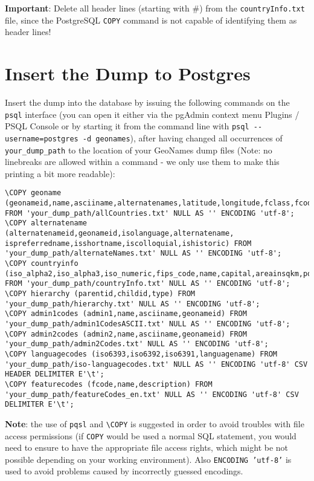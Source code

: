 \documentclass[fontsize=12pt, BCOR=10mm, DIV=14, parskip=true,headings=small]{scrartcl}
\begin{document}
\textbf{Important}: Delete all header lines (starting with \#) from the \texttt{countryInfo.txt} file, since the PostgreSQL \texttt{COPY} command is not capable of identifying them as header lines!

\section{Insert the Dump to Postgres}
Insert the dump into the database by issuing the following commands on the \texttt{psql} interface (you can open it either via the pgAdmin context menu Plugins / PSQL Console or by starting it from the command line with \verb|psql --username=postgres -d geonames|), after having changed all occurrences of \verb|your_dump_path| to the location of your GeoNames dump files (Note: no linebreaks are allowed within a command - we only use them to make this printing a bit more readable):
\begin{lstlisting}[breaklines]
\COPY geoname (geonameid,name,asciiname,alternatenames,latitude,longitude,fclass,fcode,country,cc2,admin1,admin2,admin3,admin4,population,elevation,gtopo30,timezone,moddate) FROM 'your_dump_path/allCountries.txt' NULL AS '' ENCODING 'utf-8';
\COPY alternatename (alternatenameid,geonameid,isolanguage,alternatename, ispreferredname,isshortname,iscolloquial,ishistoric) FROM 'your_dump_path/alternateNames.txt' NULL AS '' ENCODING 'utf-8';
\COPY countryinfo (iso_alpha2,iso_alpha3,iso_numeric,fips_code,name,capital,areainsqkm,population,continent,tld,currencycode,currencyname,phone,postalcodeformat,postalcoderegex,languages,geonameid,neighbors,equivfipscode) FROM 'your_dump_path/countryInfo.txt' NULL AS '' ENCODING 'utf-8';
\COPY hierarchy (parentid,childid,type) FROM 'your_dump_path/hierarchy.txt' NULL AS '' ENCODING 'utf-8';
\COPY admin1codes (admin1,name,asciiname,geonameid) FROM 'your_dump_path/admin1CodesASCII.txt' NULL AS '' ENCODING 'utf-8';
\COPY admin2codes (admin2,name,asciiname,geonameid) FROM 'your_dump_path/admin2Codes.txt' NULL AS '' ENCODING 'utf-8';
\COPY languagecodes (iso6393,iso6392,iso6391,languagename) FROM 'your_dump_path/iso-languagecodes.txt' NULL AS '' ENCODING 'utf-8' CSV HEADER DELIMITER E'\t';
\COPY featurecodes (fcode,name,description) FROM 'your_dump_path/featureCodes_en.txt' NULL AS '' ENCODING 'utf-8' CSV DELIMITER E'\t';   
\end{lstlisting}

\textbf{Note}: the use of \texttt{pqsl} and \texttt{\textbackslash COPY} is suggested in order to avoid troubles with file access permissions (if \texttt{COPY} would be used a normal SQL statement, you would need to ensure to have the appropriate file access rights, which might be not possible depending on your working environment). Also \texttt{ENCODING 'utf-8'} is used to avoid problems caused by incorrectly guessed encodings.
\end{document}
